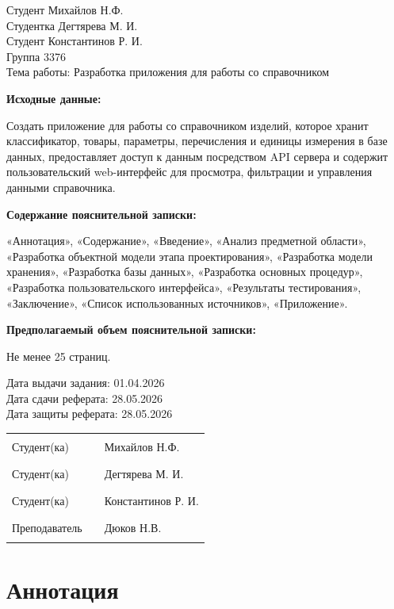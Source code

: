 \documentclass[a4paper,14pt]{extarticle}
\begin{document}
\noindent Студент Михайлов Н.Ф.\\
Студентка Дегтярева М. И.\\
Студент Константинов Р. И.\\
Группа 3376\\
Тема работы: Разработка приложения для работы со справочником

\vspace{1em}
\noindent\textbf{Исходные данные:}

Создать приложение для работы со справочником изделий, которое хранит классификатор, товары, параметры, перечисления и единицы измерения в базе данных, предоставляет доступ к данным посредством API сервера и содержит пользовательский web-интерфейс для просмотра, фильтрации и управления данными справочника.

\vspace{1em}
\noindent\textbf{Содержание пояснительной записки:}

«Аннотация», «Содержание», «Введение», «Анализ предметной области», «Разработка объектной модели этапа проектирования», «Разработка модели хранения», «Разработка базы данных», «Разработка основных процедур», «Разработка пользовательского интерфейса», «Результаты тестирования», «Заключение», «Список использованных источников», «Приложение».

\vspace{1em}
\noindent\textbf{Предполагаемый объем пояснительной записки:}

Не менее 25 страниц.

\vspace{1em}
\noindent Дата выдачи задания: 01.04.2026\\
Дата сдачи реферата: 28.05.2026\\
Дата защиты реферата: 28.05.2026

\vspace{3em}

\noindent
\begin{tabular}{@{}p{4cm}c>{\raggedleft\arraybackslash}p{5cm}@{}}
Студент(ка)  & \rule{4cm}{0.4pt} & Михайлов Н.Ф.\\[0.5em]
Студент(ка)  & \rule{4cm}{0.4pt} & Дегтярева М. И.\\[0.5em]
Студент(ка)  & \rule{4cm}{0.4pt} & Константинов Р. И.\\[0.5em]
Преподаватель & \rule{4cm}{0.4pt} & Дюков Н.В.
\end{tabular}

\newpage
\section*{Аннотация}
\end{document}

